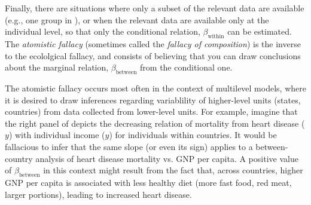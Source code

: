 Finally, there are situations where only a subset of the relevant data are available (e.g.,
one group in ), or when the relevant data are available only
at the individual level,
so that only the conditional relation,
$\beta_{\textrm{within}}$ can be estimated. The \emph{atomistic fallacy} 
(sometimes called the \emph{fallacy of composition})
is the inverse to the
ecololgical fallacy, and consists of believing that you can draw conclusions
about the marginal relation, $\beta_{\textrm{between}}$ from the conditional one.

The atomistic fallacy occurs most often in the context of multilevel models,
where it is desired to draw inferences regarding variablility of higher-level units
(states, countries) from data collected from lower-level units.
For example, imagine that the right panel of  depicts the decreasing
relation of mortality from heart disease ($y$) with individual income ($y$) for
individuals within countries. It would be fallacious to infer that the same slope
(or even its sign) applies to a between-country analysis of heart disease mortality vs.
GNP per capita. A positive value of $\beta_{\textrm{between}}$ in this context might
result from the fact that, across countries, higher GNP per capita is associated with 
less healthy diet (more fast food, red meat, larger portions), leading to increased heart disease.
 
